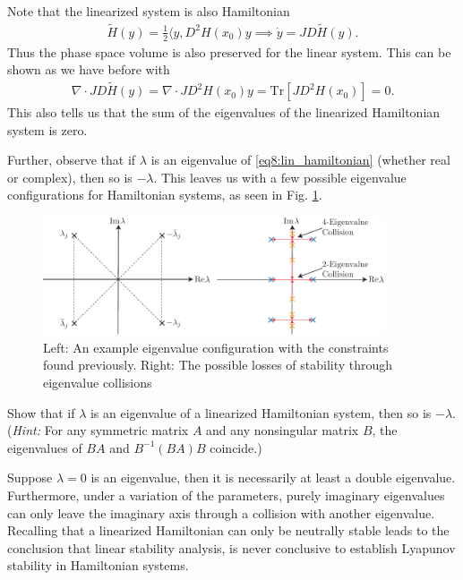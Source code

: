 Note that the linearized system is also Hamiltonian
\begin{align}
	\tilde{H}(y) = \frac{1}{2} \langle y, D^{2}H(x_0)y \implies \dot{y} = JD\tilde{H}(y).
\end{align}
Thus the phase space volume is also preserved for the linear system. This can be shown as we have before with
\begin{align}
	\nabla \cdot JD\tilde{H}(y) =  \nabla \cdot JD^2H(x_0) y =  \textrm{Tr} [JD^2H(x_0)] = 0.
\end{align}
This also tells us that the sum of the eigenvalues of the linearized Hamiltonian system is zero.

Further, observe that if $\lambda $ is an eigenvalue of \eqref{eq8:lin_hamiltonian} (whether real or complex), then so is $- \lambda $. This leaves us with a few possible eigenvalue configurations for Hamiltonian systems, as seen in Fig. \ref{fig:new_eigv_configs}.
\begin{figure}[h!]
	\centering
	\includegraphics[width=0.9\textwidth]{figures/ch8/16_eigv.pdf}
	\caption{Left: An example eigenvalue configuration with the constraints found previously. Right: The possible losses of stability through eigenvalue collisions}
	\label{fig:new_eigv_configs}
\end{figure}

\begin{exercise}
Show that if $\lambda$ is an eigenvalue of a linearized Hamiltonian system, then so is $-\lambda$. (\emph{Hint:} For any symmetric matrix $A$ and any nonsingular matrix $B$, the eigenvalues of $BA$ and $B^{-1}\left(BA\right)B$ coincide.)
\end{exercise}

Suppose $\lambda=0$ is an eigenvalue, then it is necessarily at least a double eigenvalue. Furthermore, under a variation of the parameters, purely imaginary eigenvalues can only leave the imaginary axis through a collision with another eigenvalue. 
Recalling that a linearized Hamiltonian can only be neutrally stable leads to the conclusion that linear stability analysis, is never conclusive to establish Lyapunov stability  in Hamiltonian systems. 

